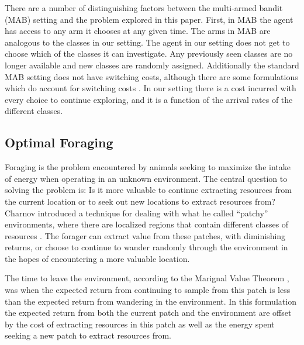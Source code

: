 
There are a number of distinguishing factors between the multi-armed bandit
(MAB) setting and the problem explored in this paper.  First, in MAB the agent
has access to any arm it chooses at any given time.  The arms in MAB are
analogous to the classes in our setting.  The agent in our setting does not get
to choose which of the classes it can investigate.  Any previously seen classes
are no longer available and new classes are randomly assigned.  Additionally
the standard MAB setting does not have switching costs, although there are some
formulations which do account for switching costs
\cite{jun2004survey}.  In our setting there is a cost incurred
with every choice to continue exploring, and it is a function of the arrival
rates of the different classes.

\subsection{Optimal Foraging}

Foraging is the problem encountered by animals seeking to maximize the intake
of energy when operating in an unknown environment.  The central question to
solving the problem is: Is it more valuable to continue extracting resources
from the current location or to seek out new locations to extract resources
from?  Charnov introduced a technique for dealing with what he called
``patchy'' environments, where there are localized regions that contain
different classes of resources \cite{charnov1976optimal}.  The forager can
extract value from these patches, with diminishing returns, or choose to
continue to wander randomly through the environment in the hopes of
encountering a more valuable location.

The time to leave the environment, according to the Marignal Value Theorem
\cite{charnov1976optimal}, was when the expected return from continuing to
sample from this patch is less than the expected return from wandering in the
environment.  In this formulation the expected return from both the current
patch and the environment are offset by the cost of extracting resources in
this patch as well as the energy spent seeking a new patch to extract resources
from.

